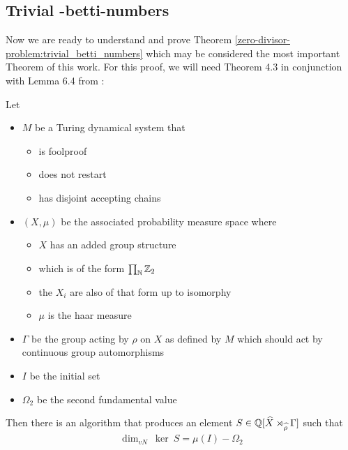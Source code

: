 \subsection{Trivial \ltwo-betti-numbers}
\label{the_zero_divisor_problem:main_theorem}

Now we are ready to understand and prove Theorem \ref{zero-divisor-problem:trivial_betti_numbers} which may be considered the most important Theorem of this work.
For this proof, we will need Theorem 4.3 in conjunction with Lemma 6.4 from \cite{gra14}:

\begin{Theorem}
	\label{the_zero_divisor_problem:grabowskis_theorem}
	Let
	\begin{itemize}
		\item{
			$M$ be a Turing dynamical system that
			\begin{itemize}
				\item is foolproof
				\item does not restart
				\item has disjoint accepting chains
			\end{itemize}
		}
		\item{
			$(X, \mu)$ be the associated probability measure space where
			\begin{itemize}
				\item $X$ has an added group structure
				\item which is of the form $\prod_{\mathbb{N}} \mathbb{Z}_2$
				\item the $X_i$ are also of that form up to isomorphy
				\item $\mu$ is the haar measure
			\end{itemize}
		}
		\item $\Gamma$ be the group acting by $\rho$ on $X$ as defined by $M$ which should act by continuous group automorphisms\footnotemark
		\item $I$ be the initial set
		\item $\Omega_2$ be the second fundamental value
	\end{itemize}

	Then there is an algorithm that produces an element $S \in \mathbb{Q}[\widehat{X} \rtimes_{\widehat{\rho}} \Gamma]$ such that
	\begin{align*}
		\dim_{vN} ~ \ker ~ S = \mu(I) - \Omega_2
	\end{align*}
\end{Theorem}


